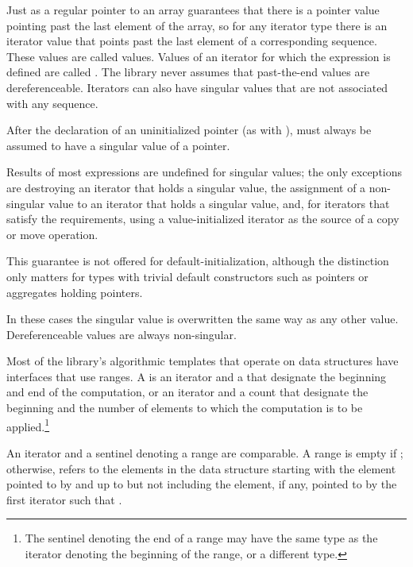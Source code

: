 \pnum
Just as a regular pointer to an array guarantees that there is a pointer value pointing past the last element
of the array, so for any iterator type there is an iterator value that points past the last element of a
corresponding sequence.
These values are called
values.
Values of an iterator
for which the expression
is defined are called
.
The library never assumes that past-the-end values are dereferenceable.
Iterators can also have singular values that are not associated with any
sequence.
\begin{example}
After the declaration of an uninitialized pointer
(as with
),
must always be assumed to have a singular value of a pointer.
\end{example}
Results of most expressions are undefined for singular values;
the only exceptions are destroying an iterator that holds a singular value,
the assignment of a non-singular value to
an iterator that holds a singular value, and, for iterators that satisfy the
 requirements, using a value-initialized iterator
as the source of a copy or move operation. \begin{note} This guarantee is not
offered for default-initialization, although the distinction only matters for types
with trivial default constructors such as pointers or aggregates holding pointers.
\end{note}
In these cases the singular
value is overwritten the same way as any other value.
Dereferenceable
values are always non-singular.

\pnum
Most of the library's algorithmic templates that operate on data structures have
interfaces that use ranges. A  is an iterator and a 
that designate the beginning and end of the computation, or an iterator and a
count that designate the beginning and the number of elements to which the
computation is to be applied.\footnote{The sentinel denoting the end of a range
may have the same type as the iterator denoting the beginning of the range, or a
different type.}

\pnum
An iterator and a sentinel denoting a range are comparable.
A range 
is empty if ;
otherwise, 
refers to the elements in the data structure starting with the element
pointed to by
and up to but not including the element, if any, pointed to by
the first iterator  such that .

